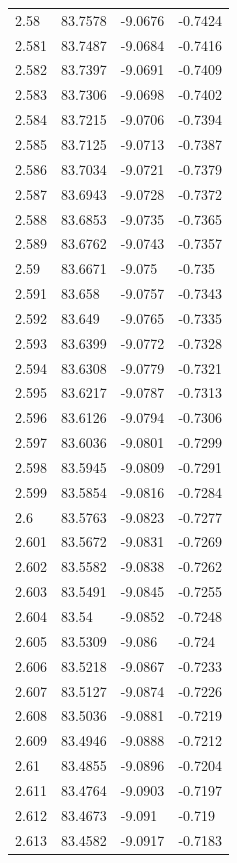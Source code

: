 \begin{tabular}{llll}
2.58 & 83.7578 & -9.0676 & -0.7424 \\
2.581 & 83.7487 & -9.0684 & -0.7416 \\
2.582 & 83.7397 & -9.0691 & -0.7409 \\
2.583 & 83.7306 & -9.0698 & -0.7402 \\
2.584 & 83.7215 & -9.0706 & -0.7394 \\
2.585 & 83.7125 & -9.0713 & -0.7387 \\
2.586 & 83.7034 & -9.0721 & -0.7379 \\
2.587 & 83.6943 & -9.0728 & -0.7372 \\
2.588 & 83.6853 & -9.0735 & -0.7365 \\
2.589 & 83.6762 & -9.0743 & -0.7357 \\
2.59 & 83.6671 & -9.075 & -0.735 \\
2.591 & 83.658 & -9.0757 & -0.7343 \\
2.592 & 83.649 & -9.0765 & -0.7335 \\
2.593 & 83.6399 & -9.0772 & -0.7328 \\
2.594 & 83.6308 & -9.0779 & -0.7321 \\
2.595 & 83.6217 & -9.0787 & -0.7313 \\
2.596 & 83.6126 & -9.0794 & -0.7306 \\
2.597 & 83.6036 & -9.0801 & -0.7299 \\
2.598 & 83.5945 & -9.0809 & -0.7291 \\
2.599 & 83.5854 & -9.0816 & -0.7284 \\
2.6 & 83.5763 & -9.0823 & -0.7277 \\
2.601 & 83.5672 & -9.0831 & -0.7269 \\
2.602 & 83.5582 & -9.0838 & -0.7262 \\
2.603 & 83.5491 & -9.0845 & -0.7255 \\
2.604 & 83.54 & -9.0852 & -0.7248 \\
2.605 & 83.5309 & -9.086 & -0.724 \\
2.606 & 83.5218 & -9.0867 & -0.7233 \\
2.607 & 83.5127 & -9.0874 & -0.7226 \\
2.608 & 83.5036 & -9.0881 & -0.7219 \\
2.609 & 83.4946 & -9.0888 & -0.7212 \\
2.61 & 83.4855 & -9.0896 & -0.7204 \\
2.611 & 83.4764 & -9.0903 & -0.7197 \\
2.612 & 83.4673 & -9.091 & -0.719 \\
2.613 & 83.4582 & -9.0917 & -0.7183 \\

\end{tabular}
